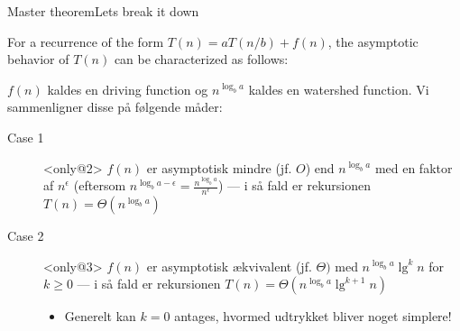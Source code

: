 \documentclass[aspectratio=1610]{beamer}
\begin{document}
\begin{frame}[t]{Master theorem}{Lets break it down}
    \begin{theorem}
        \small
        For a recurrence of the form $T(n) = aT(n/b) + f(n)$, the asymptotic
        behavior of $T(n)$ can be characterized as follows:

        \begin{enumerate}
        \end{enumerate}
    \end{theorem}

    $f(n)$ kaldes en \alert{driving function} og $n^{\log_b a}$ kaldes en
    \alert{watershed function}. Vi sammenligner disse på følgende måder:

    \begin{description}
        \item[Case 1]<only@2> $f(n)$ er \alert{asymptotisk mindre} (jf. $O$) end $n^{\log_b
            a}$ med en faktor af $n^{\epsilon}$ (eftersom $n^{\log_b a -
            \epsilon} = \frac{n^{\log_b a}}{n^{\epsilon}}$) --- i så fald er
            rekursionen $T(n) = \Theta(n^{\log_b a})$

        \item[Case 2]<only@3> $f(n)$ er \alert{asymptotisk ækvivalent} (jf. $\Theta)$
            med $n^{\log_b a} \lg^k n$ for $k \geq 0$ --- i så fald er
            rekursionen $T(n) = \Theta(n^{\log_b a} \lg^{k+1} n)$

            \begin{itemize}
                \item Generelt kan $k=0$ antages, hvormed udtrykket bliver noget
                    simplere!
            \end{itemize}


\end{description}
\end{frame}
\end{document}

